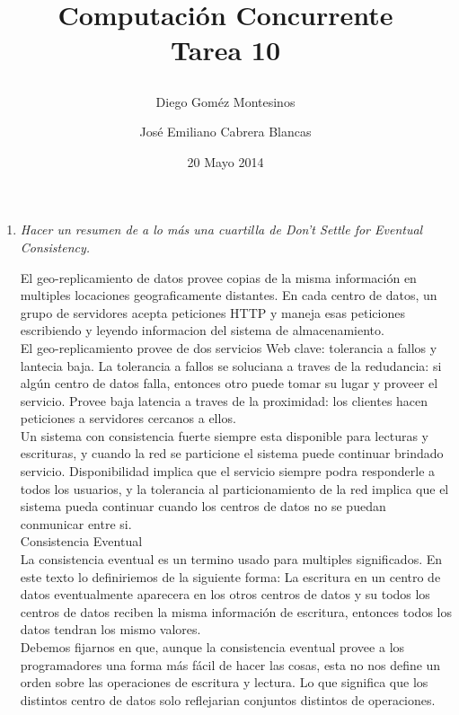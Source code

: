 \documentclass{article}
\title{ Computación Concurrente \\ \Large{Tarea 10}
\author{
  Diego Goméz Montesinos
  \and
  José Emiliano Cabrera Blancas
  }
\date{20 Mayo 2014}
}
\begin{document}
\maketitle
\begin{enumerate}
  
\item{
    \textsl{
      Hacer un resumen de a lo más una cuartilla de Don't Settle for
      Eventual Consistency.\\
    }
    
    El geo-replicamiento de datos provee copias de la misma
    información en multiples locaciones geograficamente distantes. En
    cada centro de datos, un grupo de servidores acepta peticiones
    HTTP y maneja esas peticiones escribiendo y leyendo informacion
    del sistema de almacenamiento.\\
    El geo-replicamiento provee de dos servicios Web clave: tolerancia
    a fallos y lantecia baja. La tolerancia a fallos se soluciana  a
    traves de la redudancia: si algún centro de datos falla, entonces
    otro puede tomar su lugar y proveer el servicio. Provee baja
    latencia a traves de la proximidad: los clientes hacen peticiones
    a servidores cercanos a ellos.\\
    Un sistema con consistencia fuerte siempre esta disponible para
    lecturas y escrituras, y cuando la red se
    particione el sistema puede continuar brindado
    servicio. Disponibilidad implica que el servicio siempre podra
    responderle a todos los usuarios, y la tolerancia al
    particionamiento de la red implica que el sistema pueda continuar
    cuando los centros de datos no se puedan conmunicar entre si.\\
    
    Consistencia Eventual\\
    
    La consistencia eventual es un termino usado para multiples
    significados. En este texto lo definiriemos de la siguiente forma:
    La escritura en un centro de datos eventualmente aparecera en los
    otros centros de datos y su todos los centros de datos reciben la
    misma información de escritura, entonces todos los datos tendran
    los mismo valores.\\
    Debemos fijarnos en que, aunque la consistencia eventual provee a
    los programadores una forma más fácil de hacer las cosas, esta no
    nos define un orden sobre las operaciones de escritura y
    lectura. Lo que significa que los distintos centro de datos solo
    reflejarian conjuntos distintos de operaciones.\\
    
}
\end{enumerate}
\end{document}
